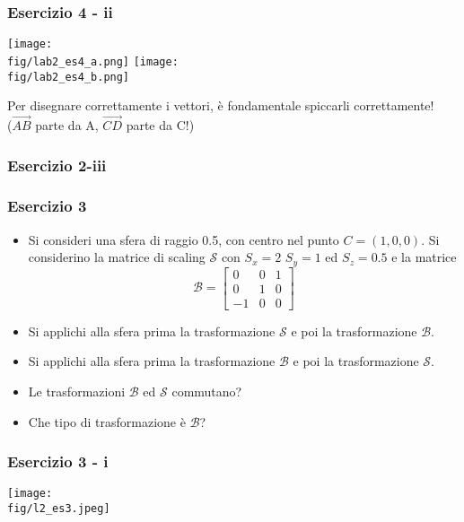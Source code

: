 \documentclass{beamer}
\newcommand{\fig}{figures} %
\begin{document}
\begin{frame}
\frametitle{Esercizio 4 - ii}
\vspace{-0.5cm}
\begin{center}
\texttt{[image: \\fig/lab2\_es4\_a.png]}
\texttt{[image: \\fig/lab2\_es4\_b.png]}
\end{center}
\vspace{-0.25cm}
Per disegnare correttamente i vettori, \`e fondamentale spiccarli correttamente!\\ ($\overrightarrow{AB}$ parte da A, $\overrightarrow{CD}$ parte da C!)
\end{frame}

\begin{frame}
\frametitle{Esercizio 2-iii}
\begin{center}
\end{center}
\end{frame}
\begin{frame}
\frametitle{Esercizio 3}
\begin{itemize}
\item Si consideri una sfera di raggio 0.5, con centro nel punto $C=(1,0,0)$. Si
considerino la matrice di scaling $\mathcal{S}$ con $S_x=2$ $S_y=1$ ed $S_z =0.5$ e la matrice 
\begin{displaymath}
\mathcal{B} =  \begin{bmatrix}
                0 & 0 & 1\\
                0  & 1 & 0\\
                -1 & 0 & 0
                \end{bmatrix}
\end{displaymath}
\item Si applichi alla sfera prima la trasformazione $\mathcal{S}$ e poi la trasformazione $\mathcal{B}$.
\item Si applichi alla sfera prima la trasformazione $\mathcal{B}$ e poi la trasformazione $\mathcal{S}$.
\item Le trasformazioni $\mathcal{B}$ ed $\mathcal{S}$ commutano?
\item Che tipo di trasformazione \`e $\mathcal{B}$?
\end{itemize}
\end{frame}
\begin{frame}
\frametitle{Esercizio 3 - i}
\texttt{[image: \\fig/l2\_es3.jpeg]}
\end{frame}
%
\end{document}
